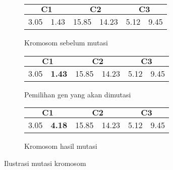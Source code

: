 \begin{figure}[H]
	\centering
	\begin{subfigure}[t]{\textwidth}
		\centering
		\begin{tabular}{|c|c|c|c|c|c|}
			\multicolumn{2}{c}{\textbf{$\mathbf{C1}$}} & \multicolumn{2}{c}{\textbf{$\mathbf{C2}$}} & \multicolumn{2}{c}{$\mathbf{C3}$}\\ \hline
		3.05 & 1.43 & 15.85 & 14.23 & 5.12 & 9.45\\ \hline
		\end{tabular}
		\caption{Kromosom sebelum mutasi}
		\label{fig:mutated:before}
	\end{subfigure}
	
	\vspace{5mm}
	\begin{subfigure}[t]{\textwidth}
		\centering
		\begin{tabular}{|c|c|c|c|c|c|}
			\multicolumn{2}{c}{\textbf{$\mathbf{C1}$}} & \multicolumn{2}{c}{\textbf{$\mathbf{C2}$}} & \multicolumn{2}{c}{$\mathbf{C3}$}\\ \hline
		3.05 & \textbf{1.43} & 15.85 & 14.23 & 5.12 & 9.45\\ \hline
		\end{tabular}
		\caption{Pemilihan gen yang akan dimutasi}
		\label{fig:mutated:choose}
	\end{subfigure}
	
	\vspace{5mm}
	\begin{subfigure}[t]{\textwidth}
		\centering
		\begin{tabular}{|c|c|c|c|c|c|}
			\multicolumn{2}{c}{\textbf{$\mathbf{C1}$}} & \multicolumn{2}{c}{\textbf{$\mathbf{C2}$}} & \multicolumn{2}{c}{$\mathbf{C3}$}\\ \hline
		3.05 & {\color{red} \textbf{4.18}} & 15.85 & 14.23 & 5.12 & 9.45\\ \hline
		\end{tabular}
		\caption{Kromosom hasil mutasi}
		\label{fig:mutated:after}
	\end{subfigure}
		\caption{Ilustrasi mutasi kromosom}
		\label{fig:mutated}
\end{figure}

%

